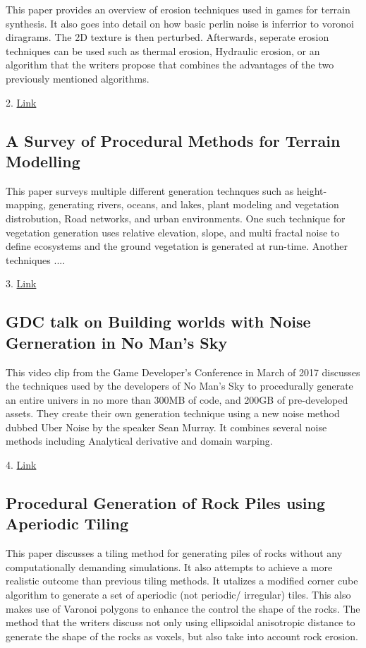 \documentclass[12pt]{article}
\begin{document}
This paper provides an overview of erosion techniques used in games for terrain synthesis. It also goes into 
detail on how basic perlin noise is inferrior to voronoi diragrams. The 2D texture is then perturbed. Afterwards, 
seperate erosion techniques can be used such as thermal erosion, Hydraulic erosion, or an algorithm that the writers 
propose that combines the advantages of the two previously mentioned algorithms.

2. \href{https://pdfs.semanticscholar.org/5961/c577478f21707dad53905362e0ec4e6ec644.pdf}{Link}

\subsection{A Survey of Procedural Methods for Terrain Modelling}

This paper surveys multiple different generation technques such as height-mapping, generating rivers, 
oceans, and lakes, plant modeling and vegetation distrobution, Road networks, and urban environments.
One such technique for vegetation generation uses relative elevation, slope, and multi fractal noise 
to define ecosystems and the ground vegetation is generated at run-time. Another techniques ....

3. \href{http://www.cg.its.tudelft.nl/Publications-new/2009/SDGTB09a/SDGTB09a.pdf}{Link}

\subsection{GDC talk on Building worlds with Noise Gerneration in No Man's Sky}

This video clip from the Game Developer's Conference in March of 2017 discusses the techniques used by the 
developers of No Man's Sky to procedurally generate an entire univers in no more than 300MB of code, and 200GB of 
pre-developed assets. They create their own generation technique using a new noise method dubbed Uber Noise by 
the speaker Sean Murray. It combines several noise methods including Analytical derivative and domain warping.

4. \href{https://www.youtube.com/watch?v=SePDzis8HqY}{Link}

\subsection{Procedural Generation of Rock Piles using Aperiodic Tiling}

This paper discusses a tiling method for generating piles of rocks without any computationally demanding simulations. 
It also attempts to achieve a more realistic outcome than previous tiling methods. It utalizes a modified corner cube 
algorithm to generate a set of aperiodic (not periodic/ irregular) tiles. This also makes use of Varonoi polygons to 
enhance the control the shape of the rocks. The method that the writers discuss not only using ellipsoidal anisotropic distance
to generate the shape of the rocks as voxels, but also take into account rock erosion.
\end{document}

